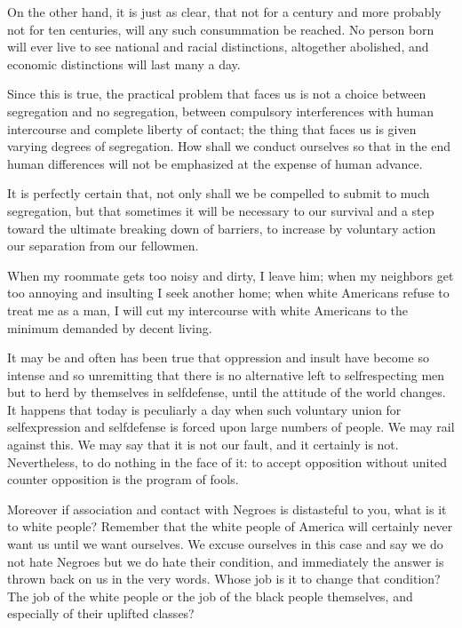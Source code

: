 \documentclass[letterpaper,10pt,english]{jupyterBook}
\begin{document}
\sphinxAtStartPar
On the other hand, it is just as clear, that not for a century and more probably not for ten centuries, will any such consummation be reached. No person born will ever live to see national and racial distinctions, altogether abolished, and economic distinctions will last many a day.

\sphinxAtStartPar
Since this is true, the practical problem that faces us is not a choice between segregation and no segregation, between compulsory interferences with human intercourse and complete liberty of contact; the thing that faces us is given varying degrees of segregation. How shall we conduct ourselves so that in the end human differences will not be emphasized at the expense of human advance.

\sphinxAtStartPar
It is perfectly certain that, not only shall we be compelled to submit to much segregation, but that sometimes it will be necessary to our survival and a step toward the ultimate breaking down of barriers, to increase by voluntary action our separation from our fellowmen.

\sphinxAtStartPar
When my room\sphinxhyphen{}mate gets too noisy and dirty, I leave him; when my neighbors get too annoying and insulting I seek another home; when white Americans refuse to treat me as a man, I will cut my intercourse with white Americans to the minimum demanded by decent living.

\sphinxAtStartPar
It may be and often has been true that oppression and insult have become so intense and so unremitting that there is no alternative left to self\sphinxhyphen{}respecting men but to herd by themselves in self\sphinxhyphen{}defense, until the attitude of the world changes. It happens that today is peculiarly a day when such voluntary union for self\sphinxhyphen{}expression and self\sphinxhyphen{}defense is forced upon large numbers of people. We may rail against this. We may say that it is not our fault, and it certainly is not. Nevertheless, to do nothing in the face of it: to accept opposition without united counter opposition is the program of fools.

\sphinxAtStartPar
Moreover if association and contact with Negroes is distasteful to you, what is it to white people? Remember that the white people of America will certainly never want us until we want ourselves. We excuse ourselves in this case and say we do not hate Negroes but we do hate their condition, and immediately the answer is thrown back on us in the very words. Whose job is it to change that condition? The job of the white people or the job of the black people themselves, and especially of their uplifted classes?
\end{document}
